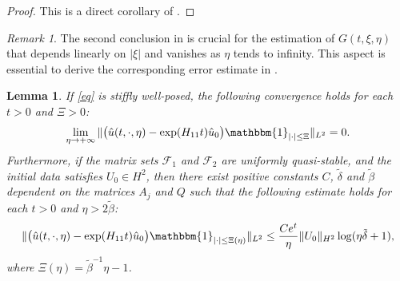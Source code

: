 \documentclass{article}
\theoremstyle{plain}%
\newtheorem{lemma}{Lemma}%
\theoremstyle{definition}%
\theoremstyle{remark}%
\newtheorem{remark}{Remark}%
\newcommand{\cF}{\mathcal{F}}
\newcommand{\+}[1]{{\bm{#1}}}
\newcommand{\norm}[1]{\|{#1}\|}
\begin{document}
\begin{proof}
  This is a direct corollary of .
\end{proof}

\begin{remark}
  The second conclusion in  is crucial for the 
  estimation of $G(t, \xi, \eta)$ that depends linearly on 
  $|\xi|$ and vanishes as $\eta$ tends to infinity. This aspect is 
  essential to derive the corresponding error estimate in .
\end{remark}

\begin{lemma}\label{lemma:low_frequency}
  If \cref{eq} is stiffly well-posed, the following convergence holds 
  for each $t > 0$ and $\Xi > 0$:
  \begin{displaymath}
    \lim \limits_{\eta \to +\infty}
    \norm{ \big( \hat{u}(t, \cdot, \eta) - \exp(H_{11} t) \hat{u}_0
    \big) \mathbbm{1}_{|\cdot| \le \Xi} }_{L^2} = 0.
  \end{displaymath}
  Furthermore, if the matrix sets $\cF_1$ and $\cF_2$ are uniformly 
  quasi-stable, and the initial data satisfies $U_0 \in H^2$, 
  then there exist positive constants $C$, $\tilde{\delta}$ and 
  $\tilde{\beta}$ dependent on the matrices $A_j$ and $Q$ such that 
  the following estimate holds for each $t > 0$ and 
  $\eta > 2 \tilde{\beta}$:
  \begin{equation}\label{eq:low_frequency_error}
    \norm{ \big( \hat{u}(t, \cdot, \eta) - \exp(H_{11} t) \hat{u}_0
    \big) \mathbbm{1}_{|\cdot| \le \Xi(\eta)} }_{L^2} \le 
    \frac{C e^{t}}{\eta} \|U_0\|_{H^2}
    \log (\eta \tilde{\delta} + 1),
  \end{equation}
  where $\Xi(\eta) = \tilde{\beta}^{-1} \eta - 1$.
\end{lemma}
\end{document}
